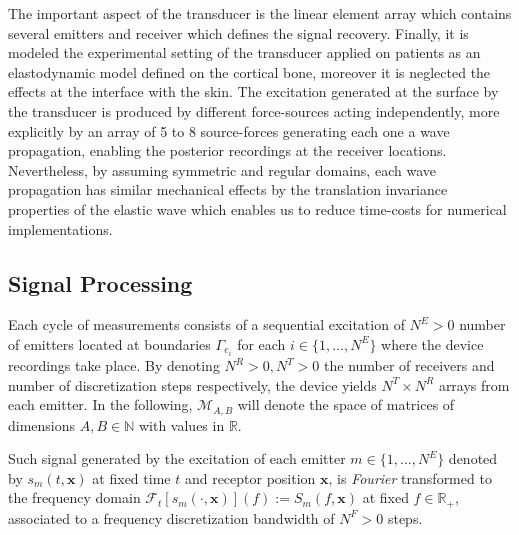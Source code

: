 The important aspect of the transducer is the linear element array which contains several emitters and receiver which defines the signal recovery. Finally, it is modeled the experimental setting of the transducer applied on patients as an elastodynamic model defined on the cortical bone, moreover it is neglected the effects at the interface with the skin. The excitation generated at the surface by the transducer is produced by different force-sources acting independently, more explicitly by an array of 5 to 8 source-forces generating each one a wave propagation, enabling the posterior recordings at the receiver locations. Nevertheless, by assuming symmetric and regular domains, each wave propagation has similar mechanical effects by the translation invariance properties of the elastic wave which enables us to reduce time-costs for numerical implementations. 

\subsection{Signal Processing}
Each cycle of measurements consists of a sequential excitation of $N^E > 0$ number of emitters located at boundaries $\Gamma_{e_i}$ for each $i \in \{1,\dots, N^E\}$ where the device recordings take place. By denoting $N^R>0, N^T>0$ the number of receivers and number of discretization steps respectively, the device yields $N^T \times N^R$ arrays from each emitter. In the following, $\mathcal{M}_{A, B}$ will denote the space of matrices of dimensions $A, B  \in \mathbb{N}$ with values in $\mathbb{R}$.

Such signal generated by the excitation of each emitter $m \in \{1,\dots, N^E\}$ denoted by $s_m(t, \mathbf{x})$ at fixed time $t$ and receptor position $\mathbf{x}$, is \textit{Fourier} transformed to the frequency domain  $\mathcal{F}_t[s_m(\cdot,\mathbf{x})](f) := S_m(f, \mathbf{x})$ at fixed $f \in \mathbb{R}_+$, associated to a frequency discretization bandwidth of $N^F > 0$ steps.

